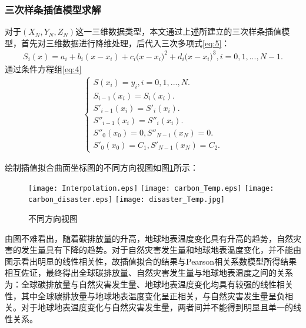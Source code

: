 \documentclass[withoutpreface,bwprint]{cumcmthesis}
\begin{document}
	\subsubsection{三次样条插值模型求解}
	对于$(X_N,Y_N,Z_N)$这一三维数据类型，本文通过上述所建立的三次样条插值模型，首先对三维数据进行降维处理，后代入三次多项式\eqref{eq:5}：
	\begin{align*}
		{{S}_{i}}(x)={{a}_{i}}+{{b}_{i}}(x-{{x}_{i}})+{{c}_{i}}(x-{{x}_{i}}{{)}^{2}}+{{d}_{i}}(x-{{x}_{i}}{{)}^{3}},i=0,1,...,N-1.
	\end{align*}
	通过条件方程组\eqref{eq:4}
	\begin{align*}
		\left \{{\begin{matrix}S\left ({{{x}_{i}}}\right )={{y}_{i}},i=0,1,...,N.\\{{S}_{i-1}}\left ({{{x}_{i}}}\right )={{S}_{i}}({{x}_{i}}).\\{{S'}_{i-1}}({{x}_{i}})={{S'}_{i}}({{x}_{i}}).\\{{S''}_{i-1}}({{x}_{i}})={{S''}_{i}}({{x}_{i}}).\\{{S''}_{0}}({{x}_{0}})=0,{{S''}_{N-1}}({{x}_{N}})=0.\\{{S'}_{0}}({{x}_{0}})={{C}_{1}},{{S'}_{N-1}}({{x}_{N}})={{C}_{2}}.\end{matrix}}\right .
	\end{align*}


	绘制插值拟合曲面坐标图的不同方向视图如图\ref{fig:chazhi}所示：
	
\begin{figure}[htbp]
	\centering
	{\texttt{[image: Interpolation.eps]}}
	{\texttt{[image: carbon\_Temp.eps]}}
	{\texttt{[image: carbon\_disaster.eps]}}
	{\texttt{[image: disaster\_Temp.jpg]}}
	\caption{不同方向视图}\label{fig:不同方向视图}
	\label{fig:chazhi}
\end{figure} 

    由图不难看出，随着碳排放量的升高，地球地表温度变化具有升高的趋势，自然灾害的发生量具有下降的趋势。对于自然灾害发生量和地球地表温度变化，并不能由图示看出明显的线性相关性，故插值拟合的结果与Pearson相关系数模型所得结果相互佐证，最终得出全球碳排放量、自然灾害发生量与地球地表温度之间的关系为：全球碳排放量与自然灾害发生量、地球地表温度变化均具有较强的线性相关性，其中全球碳排放量与地球地表温度变化呈正相关，与自然灾害发生量呈负相关。对于地球地表温度变化与自然灾害发生量，两者间并不能得到明显且单一的线性关系。
    
\end{document}
